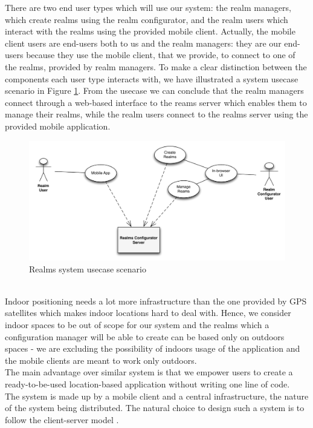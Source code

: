 \noindent There are two end user types which will use our system: the realm managers, which create realms using the realm configurator, and the realm users which interact with the realms using the provided mobile client. Actually, the mobile client users are end-users both to us and the realm managers: they are our end-users because they use the mobile client, that we provide, to connect to one of the realms, provided by realm managers. To make a clear distinction between the components each user type interacts with, we have illustrated a system usecase scenario in Figure \ref{fig.system_usecase}. From the usecase we can conclude that the realm managers connect through a web-based interface to the reams server which enables them to manage their realms, while the realm users connect to the realms server using the provided mobile application.
\begin{figure}
	\centering
	\includegraphics[width=1.0\linewidth]{fig/system_use_usecase}
	\caption{Realms system usecase scenario}
	\label{fig.system_usecase}
\end{figure}
\\

\noindent Indoor positioning needs a lot more infrastructure than the one provided by GPS satellites which makes indoor locations hard to deal with. Hence, we consider indoor spaces to be out of scope for our system and the realms which a configuration manager will be able to create can be based only on outdoors spaces - we are excluding the possibility of indoors usage of the application and the mobile clients are meant to work only outdoors.
\\

\noindent The main advantage over similar system is that we empower users to create a ready-to-be-used location-based application without writing one line of code.
\\

The system is made up by a mobile client and a central infrastructure, the nature of the system being distributed. The natural choice to design such a system is to follow the client-server model \cite{Coulouris:2005}.
\\

